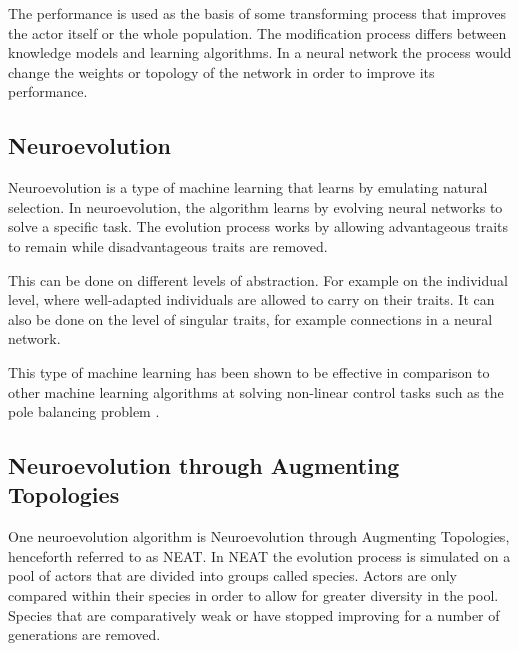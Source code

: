 The performance is used as the basis of some transforming process that improves the actor itself or the whole population. The modification process differs between knowledge models and learning algorithms. In a neural network the process would change the weights or topology of the network in order to improve its performance.

\subsection{Neuroevolution}
Neuroevolution is a type of machine learning that learns by emulating natural selection. In neuroevolution, the algorithm learns by evolving neural networks to solve a specific task. 
The evolution process works by allowing advantageous traits to remain while disadvantageous traits are removed.  

This can be done on different levels of abstraction. For example on the individual level, where well-adapted individuals are allowed to carry on their traits. It can also be done on the level of singular traits, for example connections in a neural network.

This type of machine learning has been shown to be effective in comparison to other machine learning algorithms at solving non-linear control tasks such as the pole balancing problem \cite{gomez:efficient_nonlinear_control}.

\subsection{Neuroevolution through Augmenting Topologies}
One neuroevolution algorithm is Neuroevolution through Augmenting Topologies, henceforth referred to as NEAT. In NEAT the evolution process is simulated on a pool of actors that are divided into groups called species. Actors are only compared within their species in order to allow for greater diversity in the pool. Species that are comparatively weak or have stopped improving for a number of generations are removed.  









